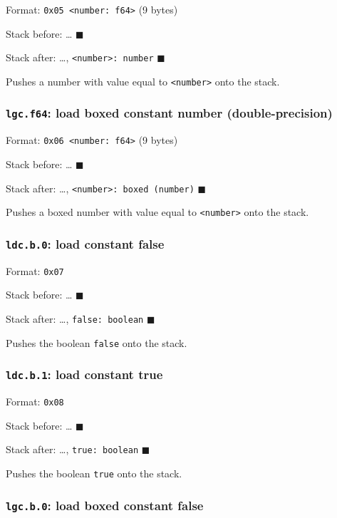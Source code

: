 Format: \texttt{0x05\ \textless{}number:\ f64\textgreater{}} (9 bytes)

Stack before: \ldots{} \(\blacksquare\)

Stack after: \ldots, \texttt{\textless{}number\textgreater{}:\ number}
\(\blacksquare\)

Pushes a number with value equal to
\texttt{\textless{}number\textgreater{}} onto the stack.

\subsubsection{\texorpdfstring{\texttt{lgc.f64}: load boxed constant
number
(double-precision)}{lgc.f64: load boxed constant number (double-precision)}}

Format: \texttt{0x06\ \textless{}number:\ f64\textgreater{}} (9 bytes)

Stack before: \ldots{} \(\blacksquare\)

Stack after: \ldots,
\texttt{\textless{}number\textgreater{}:\ boxed\ (number)}
\(\blacksquare\)

Pushes a boxed number with value equal to
\texttt{\textless{}number\textgreater{}} onto the stack.

\subsubsection{\texorpdfstring{\texttt{ldc.b.0}: load constant
false}{ldc.b.0: load constant false}}

Format: \texttt{0x07}

Stack before: \ldots{} \(\blacksquare\)

Stack after: \ldots, \texttt{false:\ boolean} \(\blacksquare\)

Pushes the boolean \texttt{false} onto the stack.

\subsubsection{\texorpdfstring{\texttt{ldc.b.1}: load constant
true}{ldc.b.1: load constant true}}

Format: \texttt{0x08}

Stack before: \ldots{} \(\blacksquare\)

Stack after: \ldots, \texttt{true:\ boolean} \(\blacksquare\)

Pushes the boolean \texttt{true} onto the stack.

\subsubsection{\texorpdfstring{\texttt{lgc.b.0}: load boxed constant
false}{lgc.b.0: load boxed constant false}}

